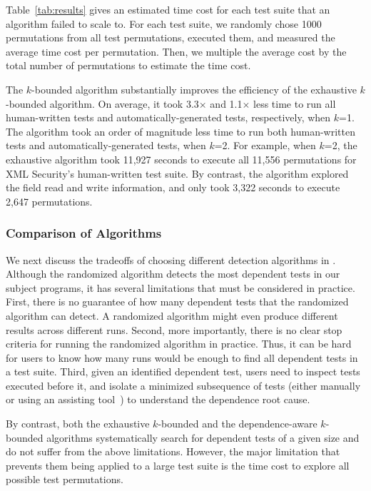 Table~\ref{tab:results} gives an estimated time cost for each
test suite that an algorithm failed to scale to. For each test suite,
we randomly chose 1000 permutations from all
test permutations, executed them, and measured the average time cost
per permutation. Then, we multiple
the average cost by the total number of permutations to estimate
the time cost.

The \dependenceaware{} $k$-bounded algorithm substantially improves
the efficiency of the exhaustive $k$-bounded algorithm. On average,
it took 3.3$\times$ and 1.1$\times$ less time to run all
human-written tests and automatically-generated tests, respectively, when $k$=1.
The \dependenceaware{} algorithm took an order of magnitude
less time to run both human-written tests and automatically-generated tests,
when $k$=2.
For example, when $k$=2, the exhaustive algorithm took 11,927 seconds
to execute all 11,556 permutations for XML Security's human-written test suite.
By contrast, the \dependenceaware{} algorithm
explored the field read and write information, and
only took 3,322 seconds to execute 2,647 permutations.





\subsubsection{Comparison of Algorithms}
\label{sec:algcomparison}

We next discuss the tradeoffs of choosing different detection
algorithms in \ourtool. Although the randomized algorithm
detects the most dependent tests in our subject programs,
it has several limitations that must be considered
in practice. First, there is no guarantee of how many
dependent tests that the randomized algorithm can detect. A randomized
algorithm might even produce different results across different runs.
Second, more importantly, there is no clear stop criteria
for running the randomized algorithm in practice.
Thus, it can be hard for users
to know how many runs would be enough to find all dependent tests in a test suite.
Third, given an identified dependent test, users
need to inspect tests executed before it, and isolate a minimized
subsequence of tests (either
manually or using an assisting tool~\cite{Zeller:2002}) to understand the dependence root cause.

By contrast, both the exhaustive $k$-bounded and the depend\-ence-aware
$k$-bounded algorithms systematically search for dependent
tests of a given size and do not suffer from the above limitations.
However, the major limitation that prevents them being applied to a
large test suite is the time cost to
explore all possible test permutations.


